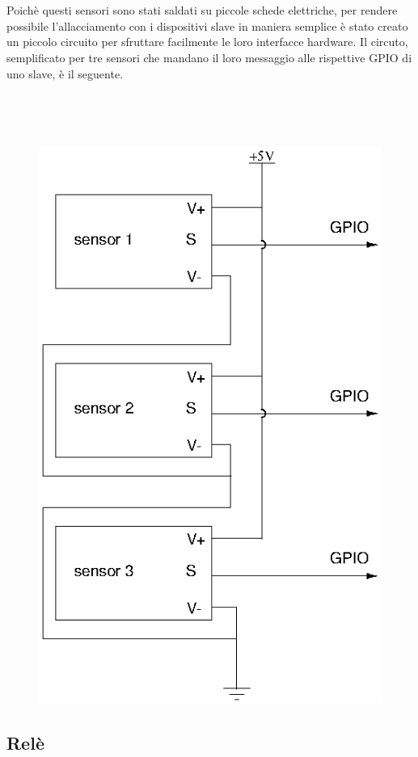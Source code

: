 \documentclass[a4paper,titlepage]{book}
\begin{document}
~

~

Poichè questi sensori sono stati saldati su piccole schede elettriche, per rendere possibile l'allacciamento con i dispositivi slave in maniera semplice è stato creato un piccolo circuito per sfruttare facilmente le loro interfacce hardware.
Il circuto, semplificato per tre sensori che mandano il loro messaggio alle rispettive GPIO di uno slave, è il seguente.

~

~

\begin{figure}[!h]
\centering
\includegraphics[scale=0.5]{circuitSensor.png}
\end{figure}


\subsection{Relè}
\end{document}

